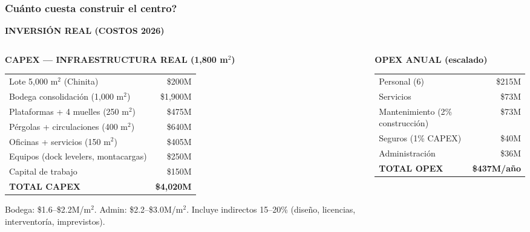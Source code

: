 \documentclass[aspectratio=169, 10pt]{beamer}
\newcommand{\tagline}[2]{{\scriptsize\color{#1}\textbf{\MakeUppercase{#2}}}}
\begin{document}
\begin{frame}
\frametitle{\textquestiondown Cu\'anto cuesta construir el centro?}
\tagline{azul}{Inversi\'on real (Costos 2026)}
\vspace{-2pt}

\begin{columns}[T]
\begin{column}{0.48\textwidth}
    {\tiny\color{gris}\textbf{CAPEX --- INFRAESTRUCTURA REAL (1,800 m$^2$)}}
    \vspace{2pt}

    \tiny
    \renewcommand{\arraystretch}{1.05}
    \begin{tabular}{l r}
        \toprule
        Lote 5,000 m$^2$ (Chinita) & \$200M \\
        Bodega consolidaci\'on (1,000 m$^2$) & \$1,900M \\
        Plataformas + 4 muelles (250 m$^2$) & \$475M \\
        P\'ergolas + circulaciones (400 m$^2$) & \$640M \\
        Oficinas + servicios (150 m$^2$) & \$405M \\
        Equipos (dock levelers, montacargas) & \$250M \\
        Capital de trabajo & \$150M \\
        \midrule
        \textcolor{azul}{\textbf{TOTAL CAPEX}} & \textcolor{azul}{\textbf{\$4,020M}} \\
        \bottomrule
    \end{tabular}

    \vspace{3pt}
    {\tiny\color{gris} Bodega: \$1.6--\$2.2M/m$^2$. Admin: \$2.2--\$3.0M/m$^2$.
    Incluye indirectos 15--20\% (dise\~no, licencias, interventor\'ia, imprevistos).}
\end{column}

\begin{column}{0.48\textwidth}
    {\tiny\color{gris}\textbf{OPEX ANUAL (escalado)}}
    \vspace{2pt}

    \tiny
    \renewcommand{\arraystretch}{1.05}
    \begin{tabular}{l r}
        \toprule
        Personal (6) & \$215M \\
        Servicios & \$73M \\
        Mantenimiento (2\% construcci\'on) & \$73M \\
        Seguros (1\% CAPEX) & \$40M \\
        Administraci\'on & \$36M \\
        \midrule
        \textcolor{amarillo}{\textbf{TOTAL OPEX}} & \textcolor{amarillo}{\textbf{\$437M/a\~no}} \\
        \bottomrule
    \end{tabular}


\end{column}
\end{columns}
\end{frame}
\end{document}
